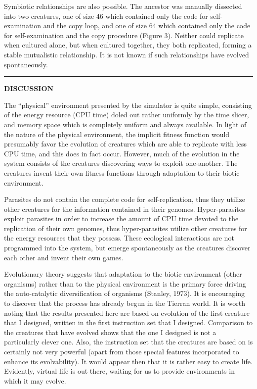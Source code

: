 Symbiotic relationships are also possible.  The ancestor was manually dissected
into two creatures, one of size 46 which contained only the code for
self-examination and the copy loop, and one of size 64 which contained only
the code for self-examination and the copy procedure (Figure 3).  Neither
could replicate when cultured alone, but when cultured together, they both
replicated, forming a stable mutualistic relationship.  It is not known if
such relationships have evolved spontaneously.

\pagebreak
\LP
\rule[6pt]{6.5in}{1pt}
\large \bf DISCUSSION\rm \normalsize
\eLP

The ``physical'' environment presented by the simulator is quite simple,
consisting of the energy resource (CPU time) doled out rather uniformly by
the time slicer, and memory space which is completely uniform and always
available.  In light of the nature of the physical environment, the implicit
fitness function would presumably favor the evolution of creatures which are
able to replicate with less CPU time, and this does in fact occur.  However,
much of the evolution in the system consists of the creatures discovering ways
to exploit one-another.  The creatures invent their own fitness functions
through adaptation to their biotic environment.

Parasites do not contain the complete code for self-replication, thus
they utilize other creatures for the information contained in their genomes.
Hyper-parasites exploit parasites in order to increase the amount of CPU time
devoted to the replication of their own genomes, thus hyper-parasites utilize
other creatures for the energy resources that they possess.  These ecological
interactions are not programmed into the system, but emerge spontaneously as
the creatures discover each other and invent their own games.

Evolutionary theory suggests that adaptation to the biotic environment (other
organisms) rather than to the physical environment is the primary force
driving the auto-catalytic diversification of organisms (Stanley, 1973).  It
is encouraging to discover that the process has already begun in the Tierran
world.  It is worth noting that the results presented here are based on
evolution of the first creature that I designed, written in the first
instruction set that I designed.  Comparison to the creatures that have
evolved shows that the one I designed is not a particularly clever one.  Also,
the instruction set that the creatures are based on is certainly not very
powerful (apart from those special features incorporated to enhance its
evolvability).  It would appear then that it is rather easy to create life.
Evidently, virtual life is out there, waiting for us to provide environments
in which it may evolve.

